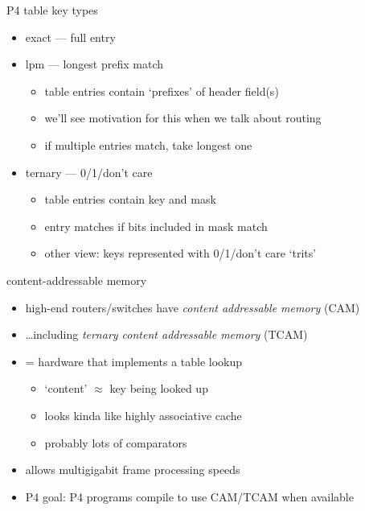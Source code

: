 \begin{frame}{P4 table key types}
    \begin{itemize}
    \item exact --- full entry
    \item lpm --- longest prefix match
        \begin{itemize}
        \item table entries contain `prefixes' of header field(s)
        \item we'll see motivation for this when we talk about routing
        \item if multiple entries match, take longest one
        \end{itemize}
    \item ternary --- 0/1/don't care
        \begin{itemize}
        \item table entries contain key and mask
        \item entry matches if bits included in mask match
        \item other view: keys represented with 0/1/don't care `trits'
        \end{itemize}
    \end{itemize}
\end{frame}

\begin{frame}{content-addressable memory}
    \begin{itemize}
    \item high-end routers/switches have \textit{content addressable memory} (CAM)
    \item \ldots including \textit{ternary content addressable memory} (TCAM)
    \vspace{.5cm}
    \item = hardware that implements a table lookup
        \begin{itemize}
        \item `content' $\approx$ key being looked up
        \item looks kinda like highly associative cache
        \item probably lots of comparators
        \end{itemize}
    \item allows multigigabit frame processing speeds
    \item P4 goal: P4 programs compile to use CAM/TCAM when available
    \end{itemize}
\end{frame}

